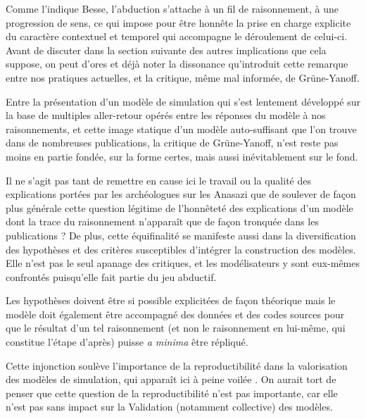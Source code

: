 
Comme l'indique Besse, l'abduction s'attache à un fil de raisonnement, à une progression de sens, ce qui impose pour être honnête la prise en charge explicite du caractère contextuel et temporel qui accompagne le déroulement de celui-ci. Avant de discuter dans la section suivante des autres implications que cela suppose, on peut d'ores et déjà noter la dissonance qu'introduit cette remarque entre nos pratiques actuelles, et la critique, même mal informée, de Grüne-Yanoff.

Entre la présentation d'un modèle de simulation qui s'est lentement développé sur la base de multiples aller-retour opérés entre les réponses du modèle à nos raisonnements, et cette image statique d'un modèle auto-suffisant que l'on trouve dans de nombreuses publications, la critique de Grüne-Yanoff, n'est reste pas moins en partie fondée, sur la forme certes, mais aussi inévitablement sur le fond.

Il ne s'agit pas tant de remettre en cause ici le travail ou la qualité des explications portées par les archéologues sur les Anasazi que de soulever de façon plus générale cette question légitime de l'honnêteté des explications d'un modèle dont la trace du raisonnement n'apparaît que de façon tronquée dans les publications ? De plus, cette équifinalité se manifeste aussi dans la diversification des hypothèses et des critères susceptibles d'intégrer la construction des modèles. Elle n'est pas le seul apanage des critiques, et les modélisateurs y sont eux-mêmes confrontés puisqu'elle fait partie du jeu abductif.

Les hypothèses doivent être si possible explicitées de façon théorique mais le modèle doit également être accompagné des données et des codes sources pour que le résultat d'un tel raisonnement (et non le raisonnement en lui-même, qui constitue l'étape d'après) puisse \textit{a minima} être répliqué. %

Cette injonction soulève l'importance de la reproductibilité dans la valorisation des modèles de simulation, qui apparaît ici à peine voilée \autocites{Amblard2006, Wilensky2007a, Rouchier2013, Thiele2015}. On aurait tort de penser que cette question de la reproductibilité n'est pas importante, car elle n'est pas sans impact sur la Validation (notamment collective) des modèles.

